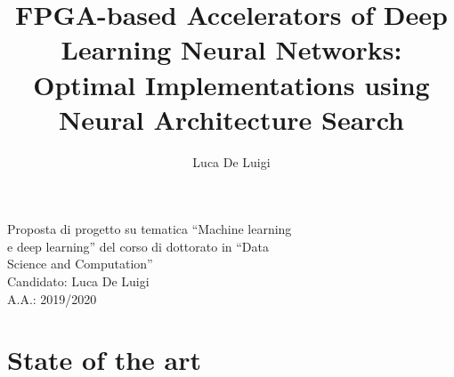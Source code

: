 \documentclass[11pt,a4paper]{article}
\author{Luca De Luigi}
\date{}
\title{FPGA-based Accelerators of Deep Learning Neural Networks: Optimal Implementations using Neural Architecture Search}
\begin{document}
\begin{titlepage}
    \vspace*{\fill}
    \begin{center}
        {\LARGE{\sc Proposta di progetto su tematica ``Machine learning}}\\
        \vspace{2mm}
        {\LARGE{\sc e deep learning'' del corso di dottorato in ``Data}}\\
        \vspace{2mm}
        {\LARGE{\sc Science and Computation''}}\\
        \vspace{10mm}
        {\large{\sc Candidato: Luca De Luigi}}\\
        {\large{\sc A.A.: 2019/2020}}\\
    \end{center}
    \vspace*{\fill}
\end{titlepage}

\maketitle

\section{State of the art}
\end{document}
